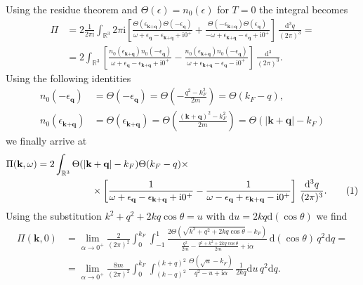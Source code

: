 \documentclass[english, parskip=full]{scrartcl}
\newcommand\numberthis{\addtocounter{equation}{1}\tag{\theequation}}
\newcommand{\intx}{}
\newcommand{\intr}{}
\newcommand{\kla}{}
\newcommand{\klam}{}
\newcommand{\tecxt}{}
\renewcommand{\i}{\text{i}}
\begin{document}
Using the residue theorem and $\Theta(\epsilon) = n_0(\epsilon)$ for $T=0$ the integral becomes
\begin{align}
\Pi &= 2 \frac{1}{2\pi\i} \intr\int_{\mathbb{R}^{3}} 2\pi\i \klam\left[ \frac{\Theta(\epsilon_{\textbf{k} + \textbf{q}}) \Theta(-\epsilon_\textbf{q})}{\omega + \epsilon_\textbf{q} - \epsilon_{\textbf{k} + \textbf{q}} + \i 0^+} + \frac{\Theta( - \epsilon_{\textbf{k} + \textbf{q}}) \Theta( \epsilon_\textbf{q})}{-\omega + \epsilon_{\textbf{k} + \textbf{q}} - \epsilon_\textbf{q} + \i 0^+} \right]  \, \frac{\mathrm{d}^{3}q}{(2\pi)^3} = \\
&= 2 \intr\int_{\mathbb{R}^{3}} \left[ \frac{n_0(\epsilon_{\textbf{k} + \textbf{q}}) n_0( -\epsilon_\textbf{q})}{\omega + \epsilon_\textbf{q} - \epsilon_{\textbf{k} + \textbf{q}} + \i 0^+} - \frac{n_0(\epsilon_{\textbf{k} + \textbf{q}}) n_0( -\epsilon_\textbf{q})}{\omega + \epsilon_{\textbf{k} + \textbf{q}} - \epsilon_\textbf{q} - \i 0^+} \right] \, \frac{\mathrm{d}^{3}}{(2\pi)^3}.
\end{align}
Using the following identities 
\begin{align}
n_0(-\epsilon_\textbf{q}) &= \Theta(-\epsilon_\textbf{q}) = \Theta \kla\left( -\frac{q^2 - k_F^2}{2m} \right) = \Theta (k_F - q),\\
n_0(\epsilon_{\textbf{k} + \textbf{q}}) &= \Theta (\epsilon_{\textbf{k} + \textbf{q}}) = \Theta \kla\left( \frac{(\textbf{k} + \textbf{q})^2 - k_F^2}{2m} \right) = \Theta ( |\textbf{k} + \textbf{q}| - k_F)
\end{align}
we finally arrive at
\begin{align*}
\Pi(\textbf{k},\omega) &= 2 \intr\int_{\mathbb{R}^{3}} \Theta(|\textbf{k} + \textbf{q}| - k_F) \Theta(k_F - q) \times \\
&\hspace{2cm} \times \left[ \frac{1}{\omega + \epsilon_\textbf{q} - \epsilon_{\mathbf{k} + \textbf{q}} + \i 0^+} - \frac{1}{\omega - \epsilon_\textbf{q} + \epsilon_{\textbf{k} + \textbf{q}} - \i 0^+} \right] \,\frac{ \mathrm{d}^{3}q}{(2\pi)^3}. \numberthis
\end{align*}
Using the substitution $k^2 + q^2 + 2kq\cos\theta = u$ with $\tecxt\text{d}u = 2kq \tecxt\text{d}(\cos\theta)$ we find
\begin{align}
\Pi(\textbf{k},0) &= \lim_{\alpha \rightarrow 0^+} \frac{2}{(2\pi)^2} \intx\int_{0}^{k_F} \intx\int_{-1}^{1} \frac{2\Theta\kla\left( \sqrt{k^2 + q^2 + 2kq\cos \theta} - k_F \right)}{\frac{q^2}{2m} - \frac{q^2 + k^2 + 2kq\cos\theta}{2m} + \i\alpha} \, \mathrm{d}(\cos\theta) \, q^2\mathrm{d}q = \\
&= \lim_{\alpha \rightarrow 0^+} \frac{8m}{(2\pi)^2} \intx\int_{0}^{k_F} \intx\int_{(k-q)^2}^{(k+q)^2} \frac{\Theta(\sqrt{u} - k_F)}{q^2 - u + \i\alpha} \, \frac{1}{2kq}\mathrm{d}u \, q^2\mathrm{d}q.
\end{align}
\end{document}
